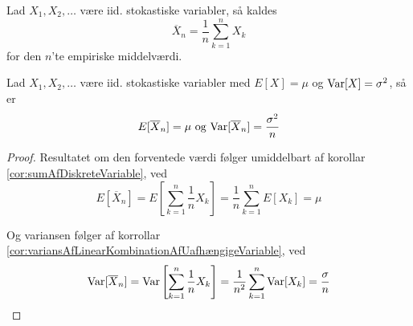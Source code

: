 \begin{defn}
  Lad $X_{1}, X_{2}, \ldots$ være iid. stokastiske variabler, så kaldes
  \[
    \overline{X}_{n} = \frac{1}{n} \sum_{k=1}^n X_{k}
  \]
  for den $n$'te empiriske middelværdi.
\end{defn}

\begin{lem} \label{lem:variansOgForventedeVærdiAfEmpiriskMiddelværdi}
  Lad $X_{1}, X_{2}, \ldots$ være iid. stokastiske variabler med $E[X] = \mu$ og $\textnormal{Var}[X] = \sigma^{2}$, så er
  \begin{equation*}
    E[\overline{X}_{n}] = \mu \text{ og } \textnormal{Var}[\overline{X}_{n}] = \frac{\sigma^{2}}{n}
  \end{equation*}
\end{lem}
\begin{proof}
  Resultatet om den forventede værdi følger umiddelbart af korollar \ref{cor:sumAfDiskreteVariable}, ved
  \begin{equation*}
    E[\overline{X}_{n}] = E \left[\sum^{n}_{k = 1} \frac{1}{n} X_{k}\right] = \frac{1}{n} \sum_{k=1}^{n} E[X_{k}] = \mu
  \end{equation*}

  Og variansen følger af korrollar \ref{cor:variansAfLinearKombinationAfUafhængigeVariable}, ved
  \begin{equation*}
    \textnormal{Var}[\overline{X}_{n}] = \textnormal{Var} \left[\sum^{n}_{k = 1} \frac{1}{n} X_{k}\right] = \frac{1}{n^{2}} \sum_{k=1}^{n} \textnormal{Var}[X_{k}] = \frac{\sigma}{n}
  \end{equation*}
\end{proof}

